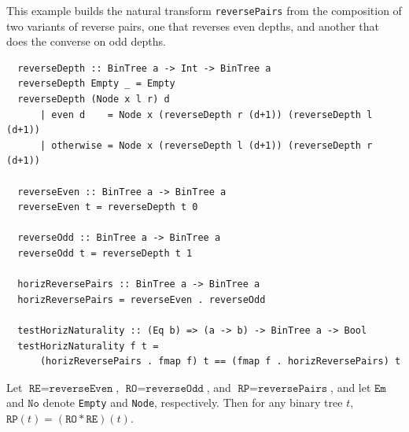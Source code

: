 \begin{example} This example builds the natural transform \texttt{reversePairs} from the composition of two variants of reverse pairs, one that reverses even depths, and another that does the converse on odd depths.
  \begin{verbatim}
  reverseDepth :: BinTree a -> Int -> BinTree a
  reverseDepth Empty _ = Empty
  reverseDepth (Node x l r) d
      | even d    = Node x (reverseDepth r (d+1)) (reverseDepth l (d+1))
      | otherwise = Node x (reverseDepth l (d+1)) (reverseDepth r (d+1))

  reverseEven :: BinTree a -> BinTree a
  reverseEven t = reverseDepth t 0
      
  reverseOdd :: BinTree a -> BinTree a
  reverseOdd t = reverseDepth t 1

  horizReversePairs :: BinTree a -> BinTree a
  horizReversePairs = reverseEven . reverseOdd

  testHorizNaturality :: (Eq b) => (a -> b) -> BinTree a -> Bool
  testHorizNaturality f t =
      (horizReversePairs . fmap f) t == (fmap f . horizReversePairs) t
    \end{verbatim}
  \end{example}
    \begin{theorem}
      \label{th:reverseevenoddtheorem}
Let $\texttt{RE} = \texttt{reverseEven}$, $\texttt{RO} = \texttt{reverseOdd}$, and $\texttt{RP} = \texttt{reversePairs}$, and let $\texttt{Em}$ and $\texttt{No}$ denote \texttt{Empty} and \texttt{Node}, respectively. Then for any binary tree $t$,
\(
\texttt{RP}(t) = (\texttt{RO} \ast \texttt{RE})(t).
\)
\end{theorem}

